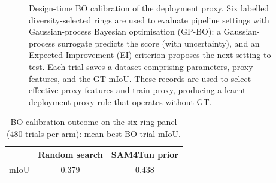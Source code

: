 \documentclass[a4paper,fleqn]{cas-dc}
\begin{document}
{\begin{figure}[t]

\caption{
Design-time BO calibration of the deployment proxy. Six labelled diversity-selected rings are used to evaluate pipeline settings with Gaussian-process Bayesian optimisation (GP-BO): a Gaussian-process surrogate predicts the score (with uncertainty), and an Expected Improvement (EI) criterion proposes the next setting to test. Each trial saves a dataset comprising parameters, proxy features, and the GT mIoU. These records are used to select effective proxy features and train proxy, producing a learnt deployment proxy rule that operates without GT.
}
\label{fig:bo_proxy_calibration}
\end{figure}

\begin{table}[t]
\caption{BO calibration outcome on the six-ring panel (480 trials per arm): mean best BO trial mIoU.}
\label{tab:bo_warmstart_miou}
\centering
\footnotesize
\begin{tabular}{lcc}
\toprule
 & Random search & SAM4Tun prior \\
\midrule
mIoU & 0.379 & 0.438 \\
\bottomrule
\end{tabular}
\vspace{1mm}


\end{table}}
\end{document}
